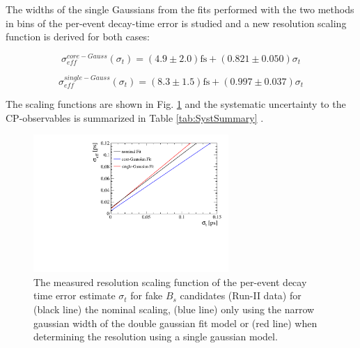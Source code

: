 The widths of the single Gaussians from the fits performed with the two methods in bins of the per-event decay-time error is studied and a new resolution scaling function is derived for both cases: \newline

\begin{equation}
\sigma_{eff}^{core-Gauss}(\sigma_t) = \left(4.9  \pm 2.0 \right) \text{fs} + \left( 0.821 \pm 0.050 \right) \sigma_t
\label{eq:ResoSyst1}
\end{equation}

\begin{equation}
\sigma_{eff}^{single-Gauss}(\sigma_t) = \left(8.3  \pm 1.5 \right) \text{fs} + \left( 0.997 \pm 0.037 \right) \sigma_t
\label{eq:ResoSyst2}
\end{equation}

The scaling functions are shown in Fig. \ref{fig:SystscaleFactor} and the systematic uncertainty to the CP-observables is summarized in Table \ref{tab:SystSummary} .


\begin{figure}[h]
\centering
\includegraphics[height=!,width=0.66\textwidth]{figs/Resolution/ResoSyst.pdf}
\caption{The measured resolution scaling function of the per-event decay time error estimate $\sigma_t$ for fake $B_s$ candidates (Run-II data) 
for (black line) the nominal scaling, (blue line) only using the narrow gaussian width of the double gaussian fit model or (red line) when determining the resolution using a single gaussian model.}
\label{fig:SystscaleFactor}
\end{figure}




